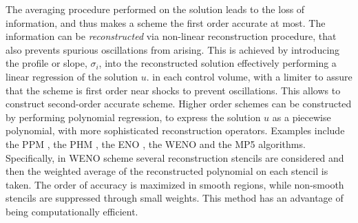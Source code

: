 The averaging procedure performed on the solution leads to the loss of information,
and thus makes a scheme the first order accurate at most.
The information can be \textit{reconstructed} via non-linear reconstruction procedure,
that also prevents spurious oscillations from arising.
This is achieved by introducing the profile or slope, $\sigma_i$, into the reconstructed solution 
effectively performing a linear regression of the solution $u$.
in each control volume, with a limiter to assure 
that the scheme is first order near shocks to prevent oscillations.
This allows to construct second-order accurate scheme. 
%
Higher order schemes can be constructed by performing 
polynomial regression, to express the solution $u$ as a piecewise polynomial, with
more sophisticated reconstruction operators.
Examples include 
the \ac{PPM} \citep{Colella:1984,Colella:2008}, 
the \ac{PHM} \citep{Marquina:1994}, 
the \ac{ENO} \citep{Harten:1987,Shu:1988,Shu:1989}, 
the \ac{WENO} \citep{Liu:1994,Jiang:1996} and 
the \ac{MP5} \citep{Suresh:1997} 
algorithms.
Specifically, in \ac{WENO} scheme several reconstruction stencils are considered and 
then the weighted average of the reconstructed polynomial on each stencil is taken.
The order of accuracy is maximized in smooth regions, while non-smooth stencils are suppressed through small weights.
This method has an advantage of being computationally efficient.
